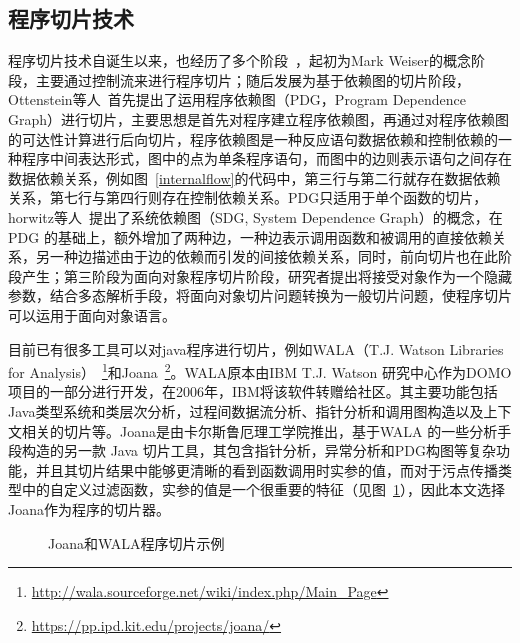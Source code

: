 \subsection{程序切片技术}
程序切片技术自诞生以来，也经历了多个阶段~\cite{slices:xu2005brief}，起初为Mark Weiser的概念阶段，主要通过控制流来进行程序切片；随后发展为基于依赖图的切片阶段，Ottenstein等人~\cite{slices:ottenstein1984program}首先提出了运用程序依赖图（PDG，Program Dependence Graph）进行切片，主要思想是首先对程序建立程序依赖图，再通过对程序依赖图的可达性计算进行后向切片，程序依赖图是一种反应语句数据依赖和控制依赖的一种程序中间表达形式，图中的点为单条程序语句，而图中的边则表示语句之间存在数据依赖关系，例如图~\ref{internalflow}的代码中，第三行与第二行就存在数据依赖关系，第七行与第四行则存在控制依赖关系。PDG只适用于单个函数的切片，horwitz等人~\cite{slices:horwitz1990}提出了系统依赖图（SDG, System Dependence Graph）的概念，在 PDG 的基础上，额外增加了两种边，一种边表示调用函数和被调用的直接依赖关系，另一种边描述由于边的依赖而引发的间接依赖关系，同时，前向切片也在此阶段产生；第三阶段为面向对象程序切片阶段，研究者提出将接受对象作为一个隐藏参数，结合多态解析手段，将面向对象切片问题转换为一般切片问题，使程序切片可以运用于面向对象语言。

目前已有很多工具可以对java程序进行切片，例如WALA（T.J. Watson Libraries for Analysis）~\footnote{\url{http://wala.sourceforge.net/wiki/index.php/Main_Page}}和Joana~\footnote{\url{https://pp.ipd.kit.edu/projects/joana/}}。WALA原本由IBM T.J. Watson 研究中心作为DOMO项目的一部分进行开发，在2006年，IBM将该软件转赠给社区。其主要功能包括Java类型系统和类层次分析，过程间数据流分析、指针分析和调用图构造以及上下文相关的切片等。Joana是由卡尔斯鲁厄理工学院推出，基于WALA 的一些分析手段构造的另一款 Java 切片工具，其包含指针分析，异常分析和PDG构图等复杂功能，并且其切片结果中能够更清晰的看到函数调用时实参的值，而对于污点传播类型中的自定义过滤函数，实参的值是一个很重要的特征（见图~\ref{fig:sliceresult}），因此本文选择Joana作为程序的切片器。
\begin{figure}[!htbp]
	\centering
	\caption{Joana和WALA程序切片示例}
	\label{fig:sliceresult} %
\end{figure}

